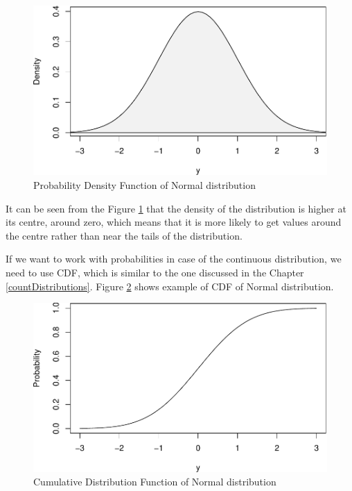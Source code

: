 \documentclass[
]{book}
\theoremstyle{definition}
\theoremstyle{definition}
\theoremstyle{definition}
\theoremstyle{definition}
\theoremstyle{remark}
\begin{document}
\begin{figure}
\centering
\includegraphics{Svetunkov---Statistics-for-Business-Analytics_files/figure-latex/dnormPlotIntro-1.pdf}
\caption{\label{fig:dnormPlotIntro}Probability Density Function of Normal distribution}
\end{figure}

It can be seen from the Figure \ref{fig:dnormPlotIntro} that the density of the distribution is higher at its centre, around zero, which means that it is more likely to get values around the centre rather than near the tails of the distribution.

If we want to work with probabilities in case of the continuous distribution, we need to use CDF, which is similar to the one discussed in the Chapter \ref{countDistributions}. Figure \ref{fig:dnormPlotIntroCDF} shows example of CDF of Normal distribution.

\begin{figure}
\centering
\includegraphics{Svetunkov---Statistics-for-Business-Analytics_files/figure-latex/dnormPlotIntroCDF-1.pdf}
\caption{\label{fig:dnormPlotIntroCDF}Cumulative Distribution Function of Normal distribution}
\end{figure}
\end{document}
